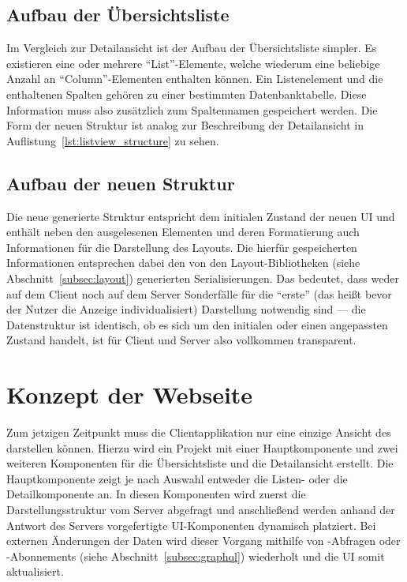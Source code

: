 \subsection{Aufbau der Übersichtsliste}
Im Vergleich zur Detailansicht ist der Aufbau der Übersichtsliste simpler. Es existieren eine oder mehrere \enquote{List}-Elemente, welche wiederum eine beliebige Anzahl an \enquote{Column}-Elementen enthalten können. Ein Listenelement und die enthaltenen Spalten gehören zu einer bestimmten Datenbanktabelle. Diese Information muss also zusätzlich zum Spaltennamen gespeichert werden. Die Form der neuen Struktur ist analog zur Beschreibung der Detailansicht in Auflistung~\ref{lst:listview_structure} zu sehen.



\subsection{Aufbau der neuen Struktur}
Die neue generierte Struktur entspricht dem initialen Zustand der neuen UI und enthält neben den ausgelesenen Elementen und deren Formatierung auch Informationen für die Darstellung des Layouts. Die hierfür gespeicherten Informationen entsprechen dabei den von den Layout-Bibliotheken (siehe Abschnitt~\ref{subsec:layout}) generierten Serialisierungen. Das bedeutet, dass weder auf dem Client noch auf dem Server Sonderfälle für die \enquote{erste} (das heißt bevor der Nutzer die Anzeige individualisiert) Darstellung notwendig sind --- die Datenstruktur ist identisch, ob es sich um den initialen oder einen angepassten Zustand handelt, ist für Client und Server also vollkommen transparent.

\section{Konzept der Webseite}
Zum jetzigen Zeitpunkt muss die Clientapplikation nur eine einzige Ansicht des  darstellen können. Hierzu wird ein Projekt mit einer Hauptkomponente und zwei weiteren Komponenten für die Übersichtsliste und die Detailansicht erstellt. Die Hauptkomponente zeigt je nach Auswahl entweder die Listen- oder die Detailkomponente an. In diesen Komponenten wird zuerst die Darstellungsstruktur vom Server abgefragt und anschließend werden anhand der Antwort des Servers vorgefertigte UI-Komponenten dynamisch platziert. Bei externen Änderungen der Daten wird dieser Vorgang mithilfe von -Abfragen oder -Abonnements (siehe Abschnitt~\ref{subsec:graphql}) wiederholt und die UI somit aktualisiert.


